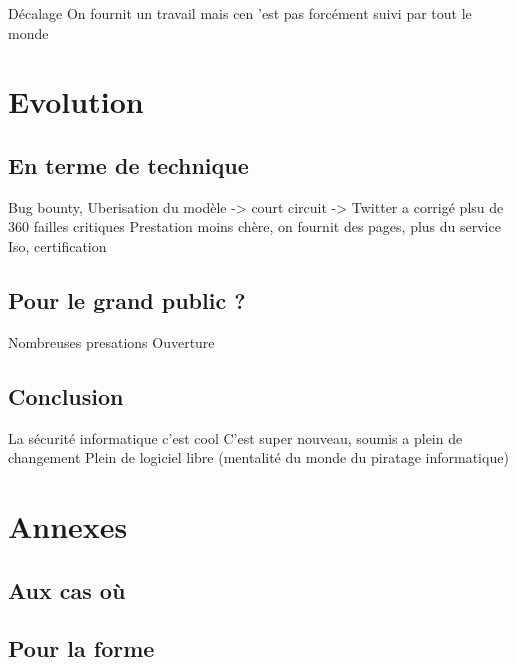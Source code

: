 \documentclass[a4paper]{memoir}
\begin{document}
Décalage
On fournit un travail mais cen 'est pas forcément suivi par tout le monde 

\part{Evolution}

\chapter{En terme de technique}

Bug bounty, Uberisation du modèle -> court circuit -> Twitter a corrigé plsu de 360 failles critiques 
Prestation moins chère, on fournit des pages, plus du service
Iso, certification

\chapter{Pour le grand public ?}

Nombreuses presations
Ouverture



\chapter*{Conclusion}

La sécurité informatique c'est cool
C'est super nouveau, soumis a plein de changement
Plein de logiciel libre (mentalité du monde du piratage informatique)


\part*{Annexes}
\appendix

\chapter{Aux cas où}

\chapter{Pour la forme}


\backmatter%

\nocite{*}



\printindex
\end{document}
